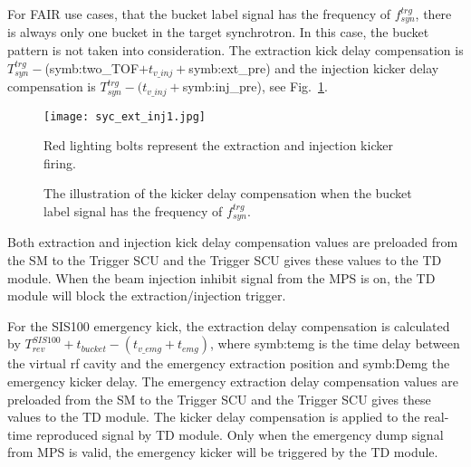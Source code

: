 For FAIR use cases, that the bucket label signal has the frequency of $f_{\mathit{syn}}^{\mathit{trg}}$, there is always only one bucket in the target synchrotron. In this case, the bucket pattern is not taken into consideration. The extraction kick delay compensation is $T_{\mathit{syn}}^{\mathit{trg}} -$(\gls{symb:two_TOF}$ + t_{v\_inj}+ $\gls{symb:ext_pre}) and the injection kicker delay compensation is $T_{\mathit{syn}}^{\mathit{trg}} - (t_{v\_inj}+ $\gls{symb:inj_pre}), see Fig.~\ref{ext_inj_kicker1}. 
\begin{figure}[!htb]
   \centering   
   \texttt{[image: syc\_ext\_inj1.jpg]}
   \caption{The illustration of the kicker delay compensation when the bucket label signal has the frequency of $f_{\mathit{syn}}^{\mathit{trg}}$.}{Red lighting bolts represent the extraction and injection kicker firing.}
   \label{ext_inj_kicker1}
\end{figure}



Both extraction and injection kick delay compensation values are preloaded from the SM to the Trigger SCU and the Trigger SCU gives these values to the TD module. When the beam injection inhibit signal from the MPS is on, the TD module will block the extraction/injection trigger.

For the SIS100 emergency kick, the extraction delay compensation is calculated by $T_{\mathit{rev}}^{\mathit{SIS100}} + t_{bucket} - (t_{v\_emg} + t_{emg})$, where \gls{symb:temg} is the time delay between the virtual rf cavity and the emergency extraction position and \gls{symb:Demg} the emergency kicker delay. The emergency extraction delay compensation values are preloaded from the SM to the Trigger SCU and the Trigger SCU gives these values to the TD module. The kicker delay compensation is applied to the real-time reproduced signal by TD module. Only when the emergency dump signal from MPS is valid, the emergency kicker will be triggered by the TD module.


